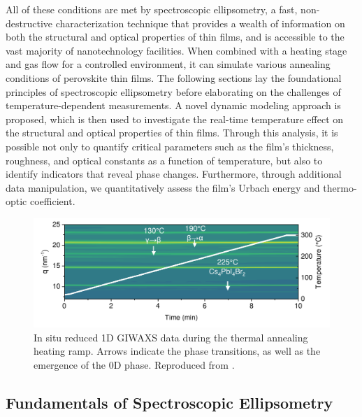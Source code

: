 All of these conditions are met by spectroscopic ellipsometry, a fast, non-destructive characterization technique that provides a wealth of information on both the structural and optical properties of thin films, and is accessible to the vast majority of nanotechnology facilities. When combined with a heating stage and gas flow for a controlled environment, it can simulate various annealing conditions of perovskite thin films. The following sections lay the foundational principles of spectroscopic ellipsometry before elaborating on the challenges of temperature-dependent measurements. A novel dynamic modeling approach is proposed, which is then used to investigate the real-time temperature effect on the structural and optical properties of  thin films. Through this analysis, it is possible not only to quantify critical parameters such as the film's thickness, roughness, and optical constants as a function of temperature, but also to identify indicators that reveal phase changes. Furthermore, through additional data manipulation, we quantitatively assess the film's Urbach energy and thermo-optic coefficient.


\begin{figure}
  \centering
  \medskip
  \includegraphics[width=\textwidth]{chapters/material_properties/images/GIWAXS_In_Situ.pdf}
  \caption[In situ reduced 1D GIWAXS data of the  film during the thermal annealing heating ramp.]{In situ reduced 1D GIWAXS data during the thermal annealing heating ramp. Arrows indicate the phase transitions, as well as the emergence of the 0D  phase. Reproduced from \cite{Papadopoulou2024InEllipsometry}.} 
  
  \label{fig:ch2:giwaxs_insitu}
\end{figure}



\subsection{Fundamentals of Spectroscopic Ellipsometry} \label{ch:ellipsometry:intro}


